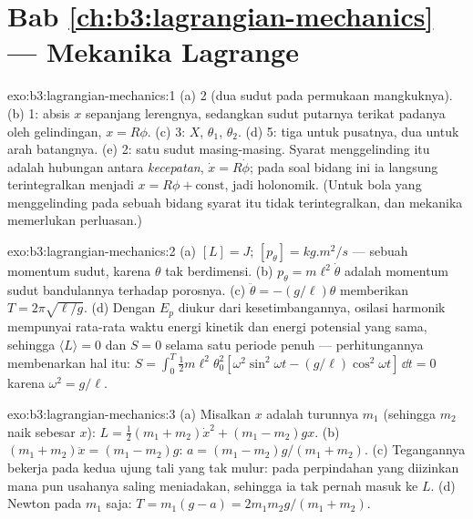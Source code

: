\section*{Bab \ref{ch:b3:lagrangian-mechanics} --- Mekanika Lagrange}

\begin{solution}{exo:b3:lagrangian-mechanics:1}
(a) 2 (dua sudut pada permukaan mangkuknya). (b) 1: absis $x$ sepanjang
lerengnya, sedangkan sudut putarnya terikat padanya oleh gelindingan, $x =
R\phi$. (c) 3: $X$, $\theta_1$, $\theta_2$. (d) 5: tiga untuk pusatnya,
dua untuk arah batangnya. (e) 2: satu sudut masing-masing. Syarat
menggelinding itu adalah hubungan antara \emph{kecepatan}, $\dot x =
R\dot\phi$; pada soal bidang ini ia langsung terintegralkan menjadi $x = R\phi +
\text{const}$, jadi holonomik. (Untuk bola yang menggelinding pada
sebuah bidang syarat itu tidak terintegralkan, dan mekanika 
memerlukan perluasan.)
\end{solution}

\begin{solution}{exo:b3:lagrangian-mechanics:2}
(a) $[L] = \unit{J}$; $[p_\theta] = \unit{kg.m^2/s}$ --- sebuah momentum
sudut, karena $\theta$ tak berdimensi. (b) $p_\theta =
m\ell^2\dot\theta$ adalah momentum sudut bandulannya terhadap porosnya.
(c) $\ddot\theta = -(g/\ell)\theta$ memberikan $T = 2\pi\sqrt{\ell/g}$. (d)
Dengan $E_p$ diukur dari kesetimbangannya, osilasi harmonik mempunyai
rata-rata waktu energi kinetik dan energi potensial yang sama, sehingga $\langle
L\rangle = 0$ dan $S = 0$ selama satu periode penuh --- perhitungannya
membenarkan hal itu: $S = \int_0^T\tfrac12 m\ell^2\theta_0^2[\omega^2\sin^2
\omega t - (g/\ell)\cos^2\omega t]\,\dd t = 0$ karena $\omega^2 =
g/\ell$.
\end{solution}

\begin{solution}{exo:b3:lagrangian-mechanics:3}
(a) Misalkan $x$ adalah turunnya $m_1$ (sehingga $m_2$ naik sebesar $x$): $L =
\tfrac12(m_1 + m_2)\dot x^2 + (m_1 - m_2)gx$. (b) $(m_1 + m_2)\ddot x =
(m_1 - m_2)g$: $a = (m_1 - m_2)g/(m_1 + m_2)$. (c) Tegangannya bekerja
pada kedua ujung tali yang tak mulur: pada perpindahan yang diizinkan
mana pun usahanya saling meniadakan, sehingga ia tak pernah masuk ke $L$.
(d) Newton pada $m_1$ saja: $T =
m_1(g - a) = 2m_1m_2g/(m_1 + m_2)$.
\end{solution}

